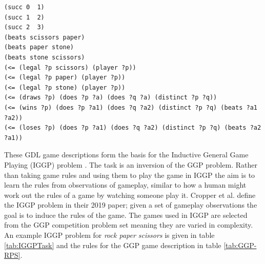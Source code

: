 \begin{listing}[ht]
\begin{Verbatim}[frame=single,fontsize=\footnotesize]
(succ 0  1)
(succ 1  2)
(succ 2  3)
(beats scissors paper)
(beats paper stone)
(beats stone scissors)
(<= (legal ?p scissors) (player ?p))
(<= (legal ?p paper) (player ?p))
(<= (legal ?p stone) (player ?p))
(<= (draws ?p) (does ?p ?a) (does ?q ?a) (distinct ?p ?q))
(<= (wins ?p) (does ?p ?a1) (does ?q ?a2) (distinct ?p ?q) (beats ?a1 ?a2))
(<= (loses ?p) (does ?p ?a1) (does ?q ?a2) (distinct ?p ?q) (beats ?a2 ?a1))
\end{Verbatim}
\caption{
A sample of rules from the GDL description of Rock Paper Scissors. The $?$ indicates a variable and $<=$ indicates an implication with the first expression after it being the head and the conjugation of the rest making up the body
}
\label{lst:GDL}
\end{listing}



These GDL game descriptions form the basis for the Inductive General Game Playing (IGGP) problem \cite{Cropper/IGGP}. The task is an inversion of the GGP problem. Rather than taking game rules and using them to play the game in IGGP the aim is to learn the rules from observations of gameplay, similar to how a human might work out the rules of a game by watching someone play it. Cropper et al. \cite{Cropper/IGGP} define the IGGP problem in their 2019 paper; given a set of gameplay observations the goal is to induce the rules of the game. The games used in IGGP are selected from the GGP competition problem set meaning they are varied in complexity. An example IGGP problem for \textit{rock paper scissors} is given in table \ref{tab:IGGPTask} and the rules for the GGP game description in table \ref{tab:GGP-RPS}.

